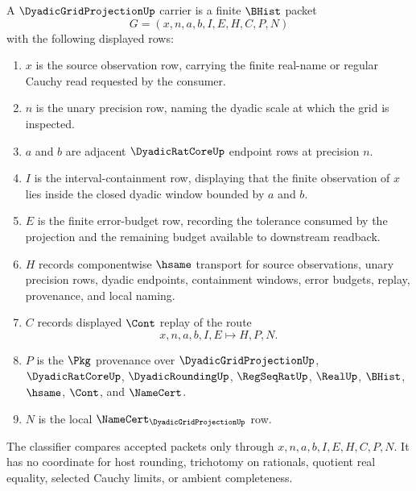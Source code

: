 \begin{definition}
\label{def:dyadic-grid-projection}
A $\DyadicGridProjectionUp$ carrier is a finite $\BHist$ packet
$$
G=(x,n,a,b,I,E,H,C,P,N)
$$
with the following displayed rows:
\begin{enumerate}
\item $x$ is the source observation row, carrying the finite real-name or regular Cauchy read requested by the consumer.
\item $n$ is the unary precision row, naming the dyadic scale at which the grid is inspected.
\item $a$ and $b$ are adjacent $\DyadicRatCoreUp$ endpoint rows at precision $n$.
\item $I$ is the interval-containment row, displaying that the finite observation of $x$ lies inside the closed dyadic window bounded by $a$ and $b$.
\item $E$ is the finite error-budget row, recording the tolerance consumed by the projection and the remaining budget available to downstream readback.
\item $H$ records componentwise $\hsame$ transport for source observations, unary precision rows, dyadic endpoints, containment windows, error budgets, replay, provenance, and local naming.
\item $C$ records displayed $\Cont$ replay of the route
$$
x,n,a,b,I,E \longmapsto H,P,N .
$$
\item $P$ is the $\Pkg$ provenance over $\DyadicGridProjectionUp$, $\DyadicRatCoreUp$, $\DyadicRoundingUp$, $\RegSeqRatUp$, $\RealUp$, $\BHist$, $\hsame$, $\Cont$, and $\NameCert$.
\item $N$ is the local $\NameCert_{\DyadicGridProjectionUp}$ row.
\end{enumerate}
The classifier compares accepted packets only through $x,n,a,b,I,E,H,C,P,N$. It has no coordinate for host rounding, trichotomy on rationals, quotient real equality, selected Cauchy limits, or ambient completeness.
\end{definition}

